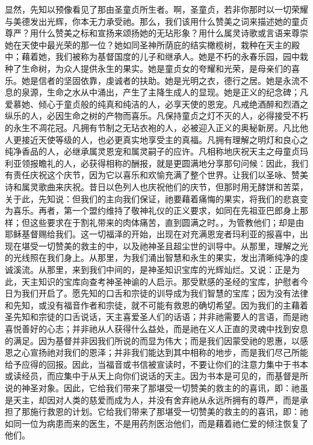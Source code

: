 显然，先知以预像看见了那由圣童贞所生者。啊，圣童贞，若非你那时以一切荣耀与美德发出光辉，你本无力承受祂。那么，我们该用什么赞美之词来描述她的童贞尊严？用什么赞美之标和宣扬来颂扬她的无玷形象？用什么属灵诗歌或言语来尊崇她在天使中最光荣的那一位？她如同圣神所荫庇的结实橄榄树，栽种在天主的殿中；藉着她，我们被称为基督国度的儿子和继承人。她是不朽的永春乐园，园中栽种了生命树，为众人提供永生的果实。她是童贞女的夸耀和光荣，是母亲们的喜乐。她是信者的坚固依靠，虔诚者的扶助。她是光明之衣，德行之居。她是永流不息的泉源，生命之水从中涌出，产生了主降生成人的显现。她是正义的纪念碑；凡爱慕她、倾心于童贞般的纯真和纯洁的人，必享天使的恩宠。凡戒绝酒醉和烈酒之纵乐的人，必因生命之树的产物而喜乐。凡保持童贞之灯不灭的人，必得接受不朽的永生不凋花冠。凡拥有节制之无玷衣袍的人，必被迎入正义的奥秘新房。凡比他人更接近天使等级的人，也必更真实地享受主的真福。凡拥有理解之明灯和良心之纯净香品的人，必继承属灵恩宠和属灵嗣子的应许。凡相称地庆祝天主之母童贞玛利亚领报瞻礼的人，必获得相称的酬报，就是更圆满地分享那句问候：因此，我们有责任庆祝这个庆节，因为它以喜乐和欢愉充满了整个世界。让我们以圣咏、赞美诗和属灵歌曲来庆祝。昔日以色列人也庆祝他们的庆节，但那时用无酵饼和苦菜，关于此，先知说：但我们的主向我们保证，祂要藉着痛悔的果实，将我们的悲哀变为喜乐。再者，第一个盟约维持了敬神礼仪的正义要求，如同在先祖亚巴郎身上那样；但这些要求在于割礼带来的肉体痛苦，直到圆满之时。，为管教他们；却是由耶稣基督赐给我们。这一切福泽的开始，出现在对充满恩宠者玛利亚的报喜中，出现在堪受一切赞美的救主的中，以及祂神圣且超尘世的训导中。从那里，理解之光的光线照在我们身上。从那里，为我们涌出智慧和永生的果实，发出清晰纯净的虔诚溪流。从那里，来到我们中间的，是神圣知识宝库的光辉灿烂。又说：正是为此，天主知识的宝库向查考神圣神谕的人启示。那受默感的圣经的宝库，护慰者今日为我们开启了。愿先知的口舌和宗徒的训导成为我们智慧的宝库；因为没有法律和先知，或没有福音作者和宗徒，就不可能有救恩的确切希望。因为我们的主藉着圣先知和宗徒的口舌说话，天主喜爱圣人们的话语；并非祂需要人的言语，而是祂喜悦善好的心志；并非祂从人获得什么益处，而是祂在义人正直的灵魂中找到安息的满足。因为基督并非因我们所说的而显为伟大；而是我们因蒙受祂的恩惠，以感恩之心宣扬祂对我们的恩泽；并非我们能达到其中相称的地步，而是我们尽己所能给予应得的回报。因此，当福音或书信被宣读时，不要让你们的注意力集中于书本或读经员，而应集中于从天上向你们说话的天主。因为书本是可见的，而基督是所说的神圣对象。因此，它给我们带来了那堪受一切赞美的救主的的喜讯，即：祂虽是天主，却因对人类的慈爱而成为人，并没有舍弃祂从永远所拥有的尊严，而是承担了那施行救恩的计划。它给我们带来了那堪受一切赞美的救主的的喜讯，即：祂如同一位为病患而来的医生，不是用药剂医治他们，而是藉着祂仁爱的倾注恢复了他们。\par

